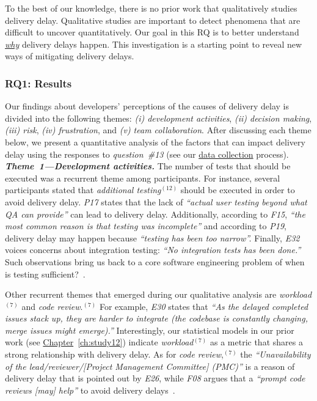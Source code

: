 To the best of our knowledge, there is no prior work that qualitatively studies
delivery delay. Qualitative studies are important to detect phenomena that are
difficult to uncover quantitatively. Our goal in this RQ is to better understand
{\em \underline{why}} delivery delays happen. This investigation is a starting
point to reveal new ways of mitigating delivery delays.\\

\subsubsection*{RQ1: Results}

\begin{sloppypar}
Our findings about developers' perceptions of the causes of delivery delay is
divided into the following themes: {\em (i) development activities}, {\em (ii)
decision making}, {\em (iii) risk}, {\em (iv) frustration}, and {\em (v) team
collaboration}. After discussing each theme below, we present a quantitative
analysis of the factors that can impact delivery delay using the responses to
{\em question~\#13} (see our \hyperref[ch5:datacollection2]{data collection}
process).\\ 

\noindent\textit{\textbf{Theme~1---Development activities.}} 
The number of tests that should be executed was a recurrent theme among
participants. For instance, several participants stated that {\em additional
testing}$^{(12)}$ should be executed in order to avoid delivery delay. {\em
P17} states that the lack of {\em ``actual user testing beyond what QA can
provide''} can lead to delivery delay. Additionally, according to {\em F15},
{\em ``the most common reason is that testing was incomplete''} and according to {\em
P19}, delivery delay may happen because {\em ``testing has been too
narrow''.} Finally, {\em E32} voices concerns about integration testing: {\em
``No integration tests has been done.''} Such observations bring us back to a
core software engineering problem of when is testing
sufficient?~\cite{beller2015much,alghamdi2016automated}.

Other recurrent themes that emerged during our qualitative analysis are {\em
workload}$^{(7)}$ and {\em code review}.$^{(7)}$ For example, {\em E30} states
that {\em ``As the delayed completed issues stack up, they are harder to
integrate (the codebase is constantly changing, merge issues might emerge).''}
Interestingly, our statistical models in our prior work (see
\hyperref[ch:study12]{Chapter}~\ref{ch:study12})
indicate {\em workload}$^{(7)}$ as a metric that shares a strong relationship
with delivery delay. As for {\em code review},$^{(7)}$ the {\em
``Unavailability of the lead/reviewer/[Project Management Committee] (PMC)''} is
a reason of delivery delay that is pointed out by {\em E26}, while {\em F08}
argues that a {\em ``prompt code reviews [may] help''} to avoid delivery
delays~\cite{mcintosh2016emse}.\\


\end{sloppypar}

